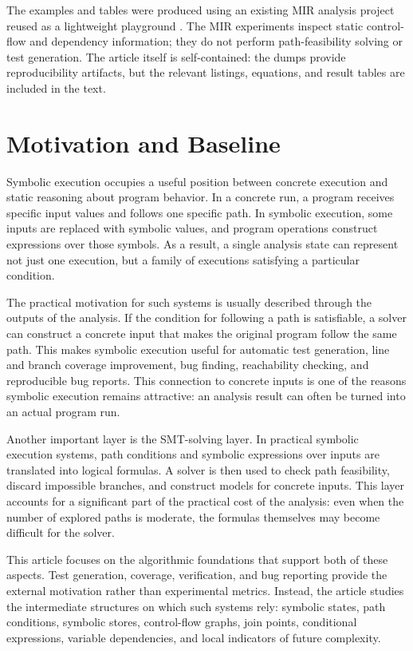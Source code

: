 \documentclass[conference]{IEEEtran}
\begin{document}
The examples and tables were produced using an existing MIR analysis project
reused as a lightweight playground \cite{compilers-course}. The MIR experiments
inspect static control-flow and dependency information; they do not perform
path-feasibility solving or test generation. The article itself is
self-contained: the dumps provide reproducibility artifacts, but the relevant
listings, equations, and result tables are included in the text.

\section{Motivation and Baseline}
\label{sec:motivation}

Symbolic execution occupies a useful position between concrete execution and
static reasoning about program behavior. In a concrete run, a program receives
specific input values and follows one specific path. In symbolic execution,
some inputs are replaced with symbolic values, and program operations construct
expressions over those symbols. As a result, a single analysis state can
represent not just one execution, but a family of executions satisfying a
particular condition.

The practical motivation for such systems is usually described through the
outputs of the analysis. If the condition for following a path is satisfiable,
a solver can construct a concrete input that makes the original program follow
the same path. This makes symbolic execution useful for automatic test
generation, line and branch coverage improvement, bug finding, reachability
checking, and reproducible bug reports. This connection to concrete inputs is
one of the reasons symbolic execution remains attractive: an analysis result
can often be turned into an actual program run.

Another important layer is the SMT-solving layer. In practical symbolic
execution systems, path conditions and symbolic expressions over inputs are
translated into logical formulas. A solver is then used to check path
feasibility, discard impossible branches, and construct models for concrete
inputs. This layer accounts for a significant part of the practical cost of
the analysis: even when the number of explored paths is moderate, the formulas
themselves may become difficult for the solver.

This article focuses on the algorithmic foundations that support both of these
aspects. Test generation, coverage, verification, and bug reporting provide the
external motivation rather than experimental metrics. Instead, the article
studies the intermediate structures on which such systems rely: symbolic states,
path conditions, symbolic stores, control-flow graphs, join points, conditional
expressions, variable dependencies, and local indicators of future complexity.
\end{document}
